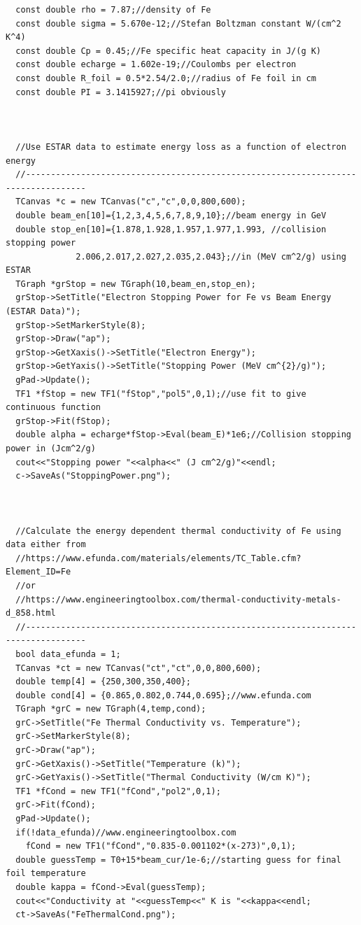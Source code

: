 \documentclass[12pt]{article}
\begin{document}
\begin{lstlisting}
  const double rho = 7.87;//density of Fe
  const double sigma = 5.670e-12;//Stefan Boltzman constant W/(cm^2 K^4)
  const double Cp = 0.45;//Fe specific heat capacity in J/(g K)
  const double echarge = 1.602e-19;//Coulombs per electron
  const double R_foil = 0.5*2.54/2.0;//radius of Fe foil in cm
  const double PI = 3.1415927;//pi obviously

  

  //Use ESTAR data to estimate energy loss as a function of electron energy
  //----------------------------------------------------------------------------------
  TCanvas *c = new TCanvas("c","c",0,0,800,600);
  double beam_en[10]={1,2,3,4,5,6,7,8,9,10};//beam energy in GeV
  double stop_en[10]={1.878,1.928,1.957,1.977,1.993, //collision stopping power 
		      2.006,2.017,2.027,2.035,2.043};//in (MeV cm^2/g) using ESTAR
  TGraph *grStop = new TGraph(10,beam_en,stop_en);
  grStop->SetTitle("Electron Stopping Power for Fe vs Beam Energy (ESTAR Data)");
  grStop->SetMarkerStyle(8);
  grStop->Draw("ap");
  grStop->GetXaxis()->SetTitle("Electron Energy");
  grStop->GetYaxis()->SetTitle("Stopping Power (MeV cm^{2}/g)");
  gPad->Update();
  TF1 *fStop = new TF1("fStop","pol5",0,1);//use fit to give continuous function
  grStop->Fit(fStop);  
  double alpha = echarge*fStop->Eval(beam_E)*1e6;//Collision stopping power in (Jcm^2/g)
  cout<<"Stopping power "<<alpha<<" (J cm^2/g)"<<endl;
  c->SaveAs("StoppingPower.png");

  

  //Calculate the energy dependent thermal conductivity of Fe using data either from
  //https://www.efunda.com/materials/elements/TC_Table.cfm?Element_ID=Fe
  //or
  //https://www.engineeringtoolbox.com/thermal-conductivity-metals-d_858.html
  //----------------------------------------------------------------------------------
  bool data_efunda = 1;
  TCanvas *ct = new TCanvas("ct","ct",0,0,800,600);
  double temp[4] = {250,300,350,400};
  double cond[4] = {0.865,0.802,0.744,0.695};//www.efunda.com
  TGraph *grC = new TGraph(4,temp,cond);
  grC->SetTitle("Fe Thermal Conductivity vs. Temperature");
  grC->SetMarkerStyle(8);
  grC->Draw("ap");
  grC->GetXaxis()->SetTitle("Temperature (k)");
  grC->GetYaxis()->SetTitle("Thermal Conductivity (W/cm K)");
  TF1 *fCond = new TF1("fCond","pol2",0,1);
  grC->Fit(fCond);
  gPad->Update();
  if(!data_efunda)//www.engineeringtoolbox.com
    fCond = new TF1("fCond","0.835-0.001102*(x-273)",0,1);
  double guessTemp = T0+15*beam_cur/1e-6;//starting guess for final foil temperature
  double kappa = fCond->Eval(guessTemp);
  cout<<"Conductivity at "<<guessTemp<<" K is "<<kappa<<endl;
  ct->SaveAs("FeThermalCond.png");



\end{lstlisting}
\end{document}
